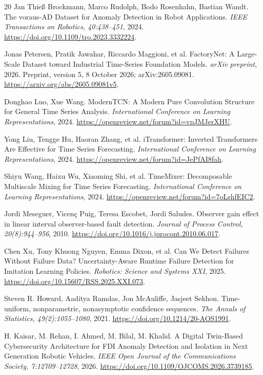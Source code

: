 \begin{thebibliography}{20}
 Jan Thieß Brockmann, Marco Rudolph, Bodo Rosenhahn, Bastian Wandt. {The voraus-AD Dataset for Anomaly Detection in Robot Applications}. \emph{IEEE Transactions on Robotics, 40:438--451}, 2024. \url{https://doi.org/10.1109/tro.2023.3332224}.

 Jonas Petersen, Pratik Jawahar, Riccardo Maggioni, et al. {FactoryNet: A Large-Scale Dataset toward Industrial Time-Series Foundation Models}. \emph{arXiv preprint}, 2026. Preprint, version 5, 8 October 2026; arXiv:2605.09081. \url{https://arxiv.org/abs/2605.09081v5}.

 Donghao Luo, Xue Wang. {ModernTCN: A Modern Pure Convolution Structure for General Time Series Analysis}. \emph{International Conference on Learning Representations}, 2024. \url{https://openreview.net/forum?id=vpJMJerXHU}.

 Yong Liu, Tengge Hu, Haoran Zhang, et al. {iTransformer: Inverted Transformers Are Effective for Time Series Forecasting}. \emph{International Conference on Learning Representations}, 2024. \url{https://openreview.net/forum?id=JePfAI8fah}.

\newpage

 Shiyu Wang, Haixu Wu, Xiaoming Shi, et al. {TimeMixer: Decomposable Multiscale Mixing for Time Series Forecasting}. \emph{International Conference on Learning Representations}, 2024. \url{https://openreview.net/forum?id=7oLshfEIC2}.

 Jordi Meseguer, Vicen{\c c} Puig, Teresa Escobet, Jordi Saludes. {Observer gain effect in linear interval observer-based fault detection}. \emph{Journal of Process Control, 20(8):944--956}, 2010. \url{https://doi.org/10.1016/j.jprocont.2010.06.017}.

 Chen Xu, Tony Khuong Nguyen, Emma Dixon, et al. {Can We Detect Failures Without Failure Data? Uncertainty-Aware Runtime Failure Detection for Imitation Learning Policies}. \emph{Robotics: Science and Systems XXI}, 2025. \url{https://doi.org/10.15607/RSS.2025.XXI.073}.

 Steven R. Howard, Aaditya Ramdas, Jon McAuliffe, Jasjeet Sekhon. {Time-uniform, nonparametric, nonasymptotic confidence sequences}. \emph{The Annals of Statistics, 49(2):1055--1080}, 2021. \url{https://doi.org/10.1214/20-AOS1991}.

 H. Kaisar, M. Rehan, I. Ahmed, M. Bilal, M. Khalid. {A Digital Twin-Based Cybersecurity Architecture for FDI Anomaly Detection and Isolation in Next Generation Robotic Vehicles}. \emph{IEEE Open Journal of the Communications Society, 7:12709--12728}, 2026. \url{https://doi.org/10.1109/OJCOMS.2026.3739185}.


\end{thebibliography}
